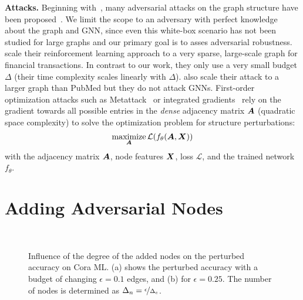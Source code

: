 \documentclass[letterpaper]{article} %
\newcommand{\adj}{\mA}
\newcommand{\features}{\mX}
\DeclareMathOperator*{\maximize}{maximize}
\begin{document}
\textbf{Attacks.} Beginning with~\citep{Dai2018, Zugner2018}, many adversarial attacks on the graph structure have been proposed~\citep{Zugner2019a, Xu2019a, Bojchevski2019, Wu2019, Wang2019, Tang2020}. We limit the scope to an adversary with perfect knowledge about the graph and GNN, since even this white-box scenario has not been studied for large graphs and our primary goal is to asses adversarial robustness. 
\citet{Dai2018} scale their reinforcement learning approach to a very sparse, large-scale graph for financial transactions. In contrast to our work, they only use a very small budget \(\Delta\) (their time complexity scales linearly with \(\Delta\)). \citet{Wang2019} also scale their attack to a larger graph than PubMed but they do not attack GNNs. First-order optimization attacks such as Metattack~\citep{Zugner2019a} or integrated gradients~\citep{Wu2019} rely on the gradient towards all possible entries in the \textit{dense} adjacency matrix \(\adj\) (quadratic space complexity) to solve the optimization problem for structure perturbations:
\begin{equation}\label{eq:attack}
    \maximize_{\adj} \mathcal{L}(f_{\theta}(\adj, \features))
\end{equation}
with the adjacency matrix \(\adj\), node features \(\features\), loss \(\mathcal{L}\), and the trained network \(f_{\theta}\).

\section{Adding Adversarial Nodes}\label{sec:attackkdd}

\begin{figure}[t]
  \centering
  \hbox{\hspace{45pt} \resizebox{0.7\linewidth}{!}{}}
  \vspace{-14pt}
  \caption{Influence of the degree of the added nodes on the perturbed accuracy on Cora ML. (a) shows the perturbed accuracy with a budget of changing \(\epsilon=0.1\) edges, and (b) for \(\epsilon=0.25\). The number of nodes is determined as \(\Delta_n = \nicefrac{\epsilon}{\Delta_e}\). \label{fig:gangnodeeffectiveness}}
\end{figure}
\end{document}
